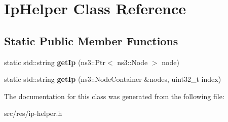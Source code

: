 \hypertarget{classIpHelper}{}\section{Ip\+Helper Class Reference}
\label{classIpHelper}
\subsection*{Static Public Member Functions}
\begin{DoxyCompactItemize}
\item 
static std\+::string {\bfseries get\+Ip} (ns3\+::\+Ptr$<$ ns3\+::\+Node $>$ node)\hypertarget{classIpHelper_a7fdc4ba881fbc6a2346e7a5d956ffbba}{}\label{classIpHelper_a7fdc4ba881fbc6a2346e7a5d956ffbba}

\item 
static std\+::string {\bfseries get\+Ip} (ns3\+::\+Node\+Container \&nodes, uint32\+\_\+t index)\hypertarget{classIpHelper_ac5a9ae62966e995b6cf916c932c6ec77}{}\label{classIpHelper_ac5a9ae62966e995b6cf916c932c6ec77}

\end{DoxyCompactItemize}


The documentation for this class was generated from the following file\+:\begin{DoxyCompactItemize}
\item 
src/res/ip-\/helper.\+h\end{DoxyCompactItemize}
